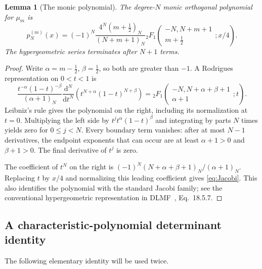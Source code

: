 \documentclass[11pt,a4paper]{article}
\numberwithin{equation}{section}
\newtheorem{lemma}[theorem]{Lemma}
\theoremstyle{definition}
\theoremstyle{remark}
\newcommand{\dd}{\mathrm d}
\newcommand{\hyp}[4]{{}_2F_1\!\left(\begin{matrix}#1,#2\\#3\end{matrix};#4\right)}
\begin{document}
\begin{lemma}[The monic polynomial]\label{lem:Jacobi}
The degree-$N$ monic orthogonal polynomial for $\mu_m$ is
\begin{equation}\label{eq:Jacobi}
 p_N^{(m)}(x)=(-1)^N
 \frac{4^N(m+\tfrac12)_N}{(N+m+1)_N}
 \hyp{-N}{N+m+1}{m+\tfrac12}{x/4}.
\end{equation}
The hypergeometric series terminates after $N+1$ terms.
\end{lemma}
\begin{proof}
Write $\alpha=m-\tfrac12$, $\beta=\tfrac12$, so both are greater than $-1$.
A Rodrigues representation on $0<t<1$ is
\begin{equation}\label{eq:Rodrigues}
 \frac{t^{-\alpha}(1-t)^{-\beta}}{(\alpha+1)_N}
 \frac{\dd^N}{\dd t^N}
       \left(t^{N+\alpha}(1-t)^{N+\beta}\right)
 =\hyp{-N}{N+\alpha+\beta+1}{\alpha+1}{t}.
\end{equation}
Leibniz's rule gives the polynomial on the right, including its
normalization at $t=0$.  Multiplying the left side by
$t^j t^\alpha(1-t)^\beta$ and integrating by parts $N$ times yields
zero for $0\leq j<N$.  Every boundary term vanishes: after at most
$N-1$ derivatives, the endpoint exponents that can occur are at least
$\alpha+1>0$ and $\beta+1>0$.  The final derivative of $t^j$ is zero.

The coefficient of $t^N$ on the right is
$(-1)^N(N+\alpha+\beta+1)_N/(\alpha+1)_N$.
Replacing $t$ by $x/4$ and normalizing this leading coefficient gives
\eqref{eq:Jacobi}.  This also identifies the polynomial with the standard
Jacobi family; see the conventional hypergeometric representation in
DLMF~\cite{DLMF}, Eq.~18.5.7.
\end{proof}

\subsection{A characteristic-polynomial determinant identity}
The following elementary identity will be used twice.
\end{document}
